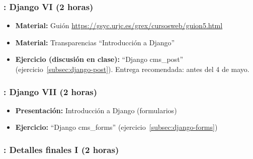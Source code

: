 \documentclass[a4paper,12pt]{article}
\begin{document}
\subsubsection{\martesL: Django VI (2 horas)}
\label{cal:martesL}

\begin{itemize}

 \item \textbf{Material:} Guión \url{https://gsyc.urjc.es/grex/cursosweb/guion5.html}
 \item \textbf{Material:} Transparencias ``Introducción a Django''
 \item \textbf{Ejercicio (discusión en clase):} ``Django cms\_post'' (ejercicio~\ref{subsec:django-post}).
  Entrega recomendada: antes del 4 de mayo.
\end{itemize}

\subsubsection{\martesM: Django VII (2 horas)}
\label{cal:martesM}

\begin{itemize}
  \item \textbf{Presentación:} Introducción a Django (formularios)
  \item \textbf{Ejercicio:} ``Django cms\_forms'' (ejercicio~\ref{subsec:django-forms}) \\
\end{itemize}



 \subsubsection{\martesN: Detalles finales I  (2 horas)}
 \label{cal:martesN}
\end{document}
